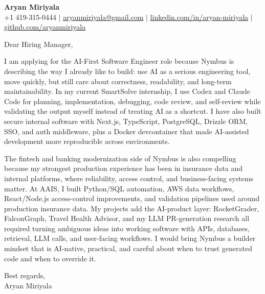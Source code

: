 \documentclass[letterpaper,11pt]{article}
\begin{document}
\begin{center}
{\Large \textbf{Aryan Miriyala}}\\
\vspace{2pt}
+1 419-315-0444 $|$ \href{mailto:aryanmiriyala@gmail.com}{aryanmiriyala@gmail.com} $|$
\href{https://www.linkedin.com/in/aryan-miriyala-7788a21b6/}{linkedin.com/in/aryan-miriyala} $|$
\href{https://github.com/aryanmiriyala}{github.com/aryanmiriyala}
\end{center}

\vspace{12pt}

Dear Hiring Manager,

I am applying for the AI-First Software Engineer role because Nymbus is describing the way I already like to build: use AI as a serious engineering tool, move quickly, but still care about correctness, readability, and long-term maintainability. In my current SmartSolve internship, I use Codex and Claude Code for planning, implementation, debugging, code review, and self-review while validating the output myself instead of treating AI as a shortcut. I have also built secure internal software with Next.js, TypeScript, PostgreSQL, Drizzle ORM, SSO, and auth middleware, plus a Docker devcontainer that made AI-assisted development more reproducible across environments.

The fintech and banking modernization side of Nymbus is also compelling because my strongest production experience has been in insurance data and internal platforms, where reliability, access control, and business-facing systems matter. At AAIS, I built Python/SQL automation, AWS data workflows, React/Node.js access-control improvements, and validation pipelines used around production insurance data. My projects add the AI-product layer: RocketGrader, FalconGraph, Travel Health Advisor, and my LLM PR-generation research all required turning ambiguous ideas into working software with APIs, databases, retrieval, LLM calls, and user-facing workflows. I would bring Nymbus a builder mindset that is AI-native, practical, and careful about when to trust generated code and when to override it.

Best regards,\\
Aryan Miriyala
\end{document}
